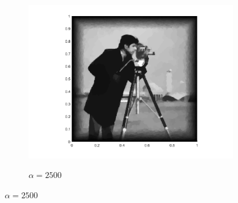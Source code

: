 \begin{figure}[!ht]
  \begin{subfigure}{.32\linewidth}
    \caption{$\alpha=2500$}
    \includegraphics[trim = 100 30 80 20, clip, width=\linewidth]
      {pictures/chapIntroduction/denoiseSNR15/alpha2500/solutionGrayscale.png}
    \label{fig:snr15alpha2500}
  \end{subfigure}

  \vspace{-3mm}
  

\end{figure}

